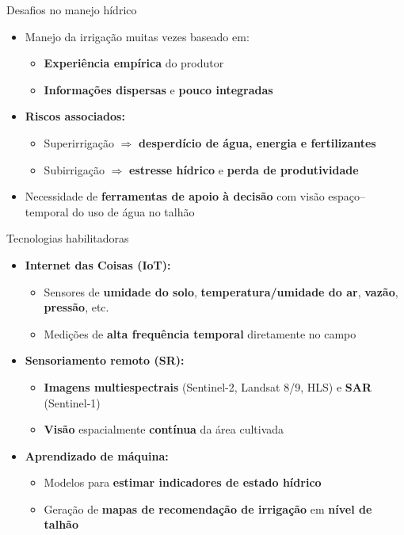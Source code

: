 \documentclass[aspectratio=169]{beamer}
\begin{document}
\begin{frame}{Desafios no manejo hídrico}
  \begin{itemize}
    \item Manejo da irrigação muitas vezes baseado em:
      \begin{itemize}
        \item \textbf{Experiência empírica} do produtor
        \item \textbf{Informações dispersas} e \textbf{pouco integradas}
      \end{itemize}
    \item \textbf{Riscos associados:}
      \begin{itemize}
        \item Superirrigação $\Rightarrow$ \textbf{desperdício de água, energia e fertilizantes}
        \item Subirrigação $\Rightarrow$ \textbf{estresse hídrico} e \textbf{perda de produtividade}
      \end{itemize}
    \item Necessidade de \textbf{ferramentas de apoio à decisão} com visão espaço--temporal do uso de água no talhão
  \end{itemize}
\end{frame}

\begin{frame}{Tecnologias habilitadoras}
  \begin{itemize}
    \item \textbf{Internet das Coisas (IoT):}
      \begin{itemize}
        \item Sensores de \textbf{umidade do solo}, \textbf{temperatura/umidade do ar}, \textbf{vazão}, \textbf{pressão}, etc.
        \item Medições de \textbf{alta frequência temporal} diretamente no campo
      \end{itemize}
    \item \textbf{Sensoriamento remoto (SR):}
      \begin{itemize}
        \item \textbf{Imagens multiespectrais} (Sentinel-2, Landsat 8/9, HLS) e \textbf{SAR} (Sentinel-1)
        \item \textbf{Visão} espacialmente \textbf{contínua} da área cultivada
      \end{itemize}
    \item \textbf{Aprendizado de máquina:}
      \begin{itemize}
        \item Modelos para \textbf{estimar indicadores de estado hídrico}
        \item Geração de \textbf{mapas de recomendação de irrigação} em \textbf{nível de talhão}
      \end{itemize}
  \end{itemize}
\end{frame}
\end{document}
